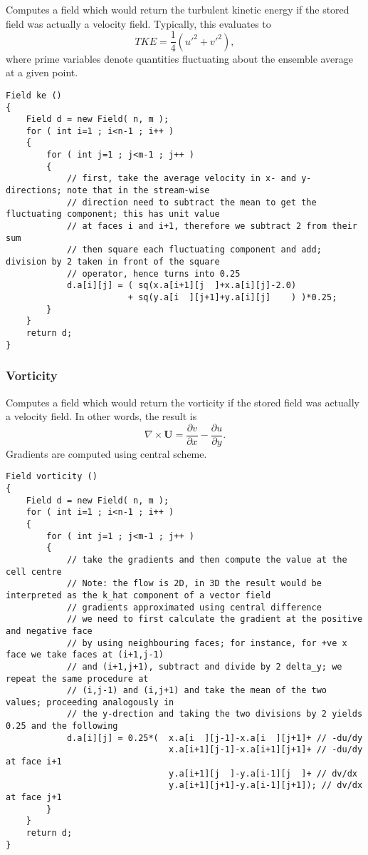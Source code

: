 \documentclass[notitlepage]{article}
\begin{document}
Computes a field which would return the turbulent kinetic energy if the stored
field was actually a velocity field. Typically, this evaluates to
%
\begin{equation}
TKE = \frac{1}{4} \left( u'^2 + v'^2 \right),
\end{equation}
%
where prime variables denote quantities fluctuating about the ensemble average at a given point.

\begin{lstlisting}[style=myCpp]
Field ke ()
{
	Field d = new Field( n, m );
	for ( int i=1 ; i<n-1 ; i++ )
	{
		for ( int j=1 ; j<m-1 ; j++ )
		{
			// first, take the average velocity in x- and y-directions; note that in the stream-wise
			// direction need to subtract the mean to get the fluctuating component; this has unit value
			// at faces i and i+1, therefore we subtract 2 from their sum
			// then square each fluctuating component and add; division by 2 taken in front of the square
			// operator, hence turns into 0.25
			d.a[i][j] = ( sq(x.a[i+1][j  ]+x.a[i][j]-2.0)
				 		+ sq(y.a[i  ][j+1]+y.a[i][j]    ) )*0.25;
		}
	}
	return d;
}
\end{lstlisting}

\subsubsection{Vorticity}

Computes a field which would return the vorticity if the stored
field was actually a velocity field. In other words, the result is
%
\begin{equation}
\nabla \times \mathbf{U} = \frac{\partial v}{\partial x} - \frac{\partial u}{\partial y}.
\end{equation}
%
Gradients are computed using central scheme.

\begin{lstlisting}[style=myCpp]
Field vorticity ()
{
	Field d = new Field( n, m );
	for ( int i=1 ; i<n-1 ; i++ )
	{
		for ( int j=1 ; j<m-1 ; j++ )
		{
			// take the gradients and then compute the value at the cell centre
			// Note: the flow is 2D, in 3D the result would be interpreted as the k_hat component of a vector field
			// gradients approximated using central difference
			// we need to first calculate the gradient at the positive and negative face
			// by using neighbouring faces; for instance, for +ve x face we take faces at (i+1,j-1)
			// and (i+1,j+1), subtract and divide by 2 delta_y; we repeat the same procedure at
			// (i,j-1) and (i,j+1) and take the mean of the two values; proceeding analogously in
			// the y-drection and taking the two divisions by 2 yields 0.25 and the following
			d.a[i][j] = 0.25*(	x.a[i  ][j-1]-x.a[i  ][j+1]+ // -du/dy
								x.a[i+1][j-1]-x.a[i+1][j+1]+ // -du/dy at face i+1
								y.a[i+1][j  ]-y.a[i-1][j  ]+ // dv/dx
								y.a[i+1][j+1]-y.a[i-1][j+1]); // dv/dx at face j+1
		}
	}
	return d;
}
\end{lstlisting}
\end{document}
